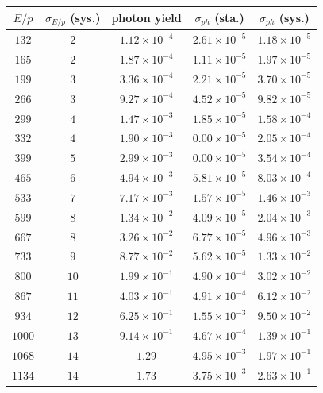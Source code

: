 \documentclass[%
 reprint,
superscriptaddress,
 amsmath,amssymb,
 aps,
]{revtex4-2}
\begin{document}
\begin{table}[t!]
\centering
\begin{tabular}{c c c c c}
\hline \hline
$E/p$ & $\sigma _{E/p}$ (sys.) & photon yield &  $\sigma _{ph}$ (sta.) &  $\sigma _{ph}$  (sys.) \\
\hline
$132$ &	$2$ &	$1.12 \times 10^{-4}$ & 	$2.61 \times 10^{-5}$ & 	$1.18 \times 10^{-5}$ 	\\
$165$ &	$2$ &	$1.87 \times 10^{-4}$ & 	$1.11 \times 10^{-5}$ & 	$1.97 \times 10^{-5}$ 	\\
$199$ &	$3$ &	$3.36 \times 10^{-4}$ & 	$2.21 \times 10^{-5}$ & 	$3.70 \times 10^{-5}$ 	\\
$266$ &	$3$ &	$9.27 \times 10^{-4}$ & 	$4.52 \times 10^{-5}$ & 	$9.82 \times 10^{-5}$ 	\\
$299$ &	$4$ &	$1.47 \times 10^{-3}$ & 	$1.85 \times 10^{-5}$ & 	$1.58 \times 10^{-4}$ 	\\
$332$ &	$4$ &	$1.90 \times 10^{-3}$ & 	$0.00 \times 10^{-5}$ & 	$2.05 \times 10^{-4}$ 	\\
$399$ &	$5$ &	$2.99 \times 10^{-3}$ & 	$0.00 \times 10^{-5}$ & 	$3.54 \times 10^{-4}$ 	\\
$465$ &	$6$ &	$4.94 \times 10^{-3}$ & 	$5.81 \times 10^{-5}$ & 	$8.03 \times 10^{-4}$ 	\\
$533$ &	$7$ &	$7.17 \times 10^{-3}$ & 	$1.57 \times 10^{-5}$ & 	$1.46 \times 10^{-3}$ 	\\
$599$ &	$8$ &	$1.34 \times 10^{-2}$ & 	$4.09 \times 10^{-5}$ & 	$2.04 \times 10^{-3}$ 	\\
$667$ &	$8$ &	$3.26 \times 10^{-2}$ & 	$6.77 \times 10^{-5}$ & 	$4.96 \times 10^{-3}$ 	\\
$733$ &	$9$ &	$8.77 \times 10^{-2}$ & 	$5.62 \times 10^{-5}$ & 	$1.33 \times 10^{-2}$ 	\\
$800$ &	$10$ &	$1.99 \times 10^{-1}$ & 	$4.90 \times 10^{-4}$ & 	$3.02 \times 10^{-2}$ 	\\
$867$ &	$11$ &	$4.03 \times 10^{-1}$ & 	$4.91 \times 10^{-4}$ & 	$6.12 \times 10^{-2}$ 	\\
$934$ &	$12$ &	$6.25 \times 10^{-1}$ & 	$1.55 \times 10^{-3}$ & 	$9.50 \times 10^{-2}$ 	\\
$1000$ &	$13$ &	$9.14 \times 10^{-1}$ & 	$4.67 \times 10^{-4}$ & 	$1.39 \times 10^{-1}$ 	\\
$1068$ &	$14$ &	$1.29$ &	$4.95 \times 10^{-3}$ & 	$1.97 \times 10^{-1}$ 	\\
$1134$ &	$14$ &	$1.73$ &	$3.75 \times 10^{-3}$ & 	$2.63 \times 10^{-1}$ 	\\

\end{tabular}
\end{table}
\end{document}
